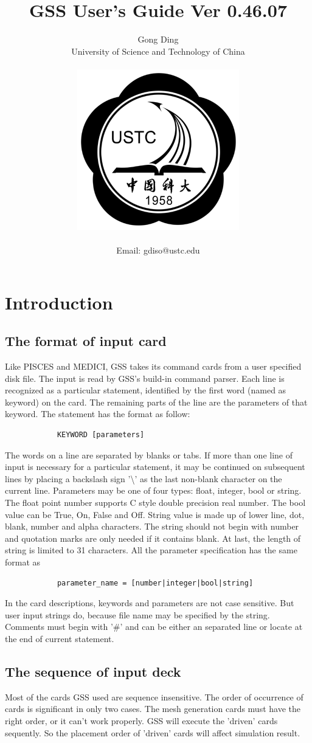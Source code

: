 \documentclass[11pt,pdftex]{article}
\title{GSS User's Guide Ver 0.46.07}
\author{Gong Ding
    \\University of Science and Technology of China
    \\\centerline{\includegraphics[scale=0.3]{USTCLogo.png}}
    \\Email: gdiso@ustc.edu
}
\begin{document}
\thispagestyle{empty}
\maketitle
\tableofcontents
\setcounter{tocdepth}{2}%

\section{Introduction}
\subsection{The format of input card}
Like PISCES and MEDICI, GSS takes its command cards from a user
specified disk file. The input is read by GSS's build-in command
parser. Each line is recognized as a particular statement,
identified by the first word (named as keyword) on the card. The
remaining parts of the line are the parameters of that keyword. The
statement has the format as follow:
\begin{verbatim}
            KEYWORD [parameters]
\end{verbatim}
The words on a line are separated by blanks or tabs. If more than
one line of input is necessary for a particular statement, it may be
continued on subsequent lines by placing a backslash sign
'\textbackslash' as the last non-blank character on the current
line. Parameters may be one of four types: float, integer, bool or
string. The float point number supports C style double precision
real number. The bool value can be True, On, False and Off. String
value is made up of lower line, dot, blank, number and alpha
characters. The string should not begin with number and quotation
marks are only needed if it contains blank. At last, the length of
string is limited to 31 characters. All the parameter specification
has the same format as
\begin{verbatim}
            parameter_name = [number|integer|bool|string]
\end{verbatim}


In the card descriptions, keywords and parameters are not case
sensitive. But user input strings do, because file name may be
specified by the string. Comments must begin with '\#' and can be
either an separated line or locate at the end of current statement.

\subsection{The sequence of input deck}
Most of the cards GSS used are sequence insensitive. The order of
occurrence of cards is significant in only two cases. The mesh
generation cards must have the right order, or it can't work
properly. GSS will execute the 'driven' cards sequently. So the
placement order of 'driven' cards will affect simulation result.
\end{document}
